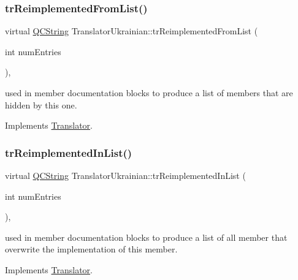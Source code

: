 \subsubsection{\texorpdfstring{trReimplementedFromList()}{trReimplementedFromList()}}
{\footnotesize\ttfamily virtual \mbox{\hyperlink{class_q_c_string}{Q\+C\+String}} Translator\+Ukrainian\+::tr\+Reimplemented\+From\+List (\begin{DoxyParamCaption}\item[{int}]{num\+Entries }\end{DoxyParamCaption})\hspace{0.3cm}{\ttfamily [inline]}, {\ttfamily [virtual]}}

used in member documentation blocks to produce a list of members that are hidden by this one. 

Implements \mbox{\hyperlink{class_translator}{Translator}}.

\mbox{\label{class_translator_ukrainian_aae7531e906a3d9407825f857f452851b}} 
\subsubsection{\texorpdfstring{trReimplementedInList()}{trReimplementedInList()}}
{\footnotesize\ttfamily virtual \mbox{\hyperlink{class_q_c_string}{Q\+C\+String}} Translator\+Ukrainian\+::tr\+Reimplemented\+In\+List (\begin{DoxyParamCaption}\item[{int}]{num\+Entries }\end{DoxyParamCaption})\hspace{0.3cm}{\ttfamily [inline]}, {\ttfamily [virtual]}}

used in member documentation blocks to produce a list of all member that overwrite the implementation of this member. 

Implements \mbox{\hyperlink{class_translator}{Translator}}.

\mbox{\label{class_translator_ukrainian_a37153ea18e7b6534a23fb4fa5fc5ed52}} 
